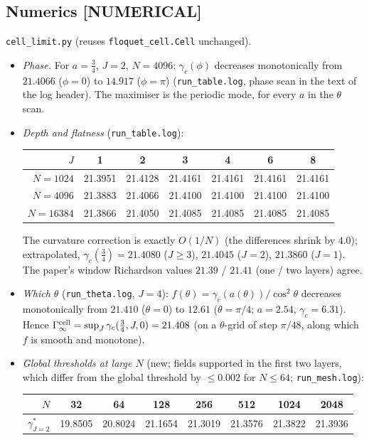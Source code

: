 \documentclass[11pt]{article}
\theoremstyle{definition}
\theoremstyle{remark}
\newcommand{\lab}[1]{\textbf{[#1]}}
\begin{document}
\subsection{Numerics \lab{NUMERICAL}}\label{sec:gamnum}
\texttt{cell\_limit.py} (reuses \texttt{floquet\_cell.Cell} unchanged).
\begin{itemize}
\item \emph{Phase.} For $a=\frac34$, $J=2$, $N=4096$: $\gamma_c(\phi)$ decreases monotonically from $21.4066$ ($\phi=0$) to $14.917$ ($\phi=\pi$) (\texttt{run\_table.log}, phase scan in the text of the log header). The maximiser is the periodic mode, for every $a$ in the $\theta$ scan.
\item \emph{Depth and flatness} (\texttt{run\_table.log}):
\begin{center}\small
\begin{tabular}{r|cccccc}
\toprule
$J$ & 1 & 2 & 3 & 4 & 6 & 8\\
\midrule
$N=1024$ & 21.3951 & 21.4128 & 21.4161 & 21.4161 & 21.4161 & 21.4161\\
$N=4096$ & 21.3883 & 21.4066 & 21.4100 & 21.4100 & 21.4100 & 21.4100\\
$N=16384$ & 21.3866 & 21.4050 & 21.4085 & 21.4085 & 21.4085 & 21.4085\\
\bottomrule
\end{tabular}
\end{center}
The curvature correction is exactly $O(1/N)$ (the differences shrink by $4.0$); extrapolated, $\gamma_c(\frac34)=21.4080$ ($J\ge3$), $21.4045$ ($J=2$), $21.3860$ ($J=1$). The paper's window Richardson values $21.39$ / $21.41$ (one / two layers) agree.
\item \emph{Which $\theta$} (\texttt{run\_theta.log}, $J=4$): $f(\theta)=\gamma_c(a(\theta))/\cos^2\theta$ decreases monotonically from $21.410$ ($\theta=0$) to $12.61$ ($\theta=\pi/4$; $a=2.54$, $\gamma_c=6.31$). Hence $\Gamma^{\rm cell}_\infty=\sup_J\gamma_c(\frac34,J,0)=21.408$ (on a $\theta$-grid of step $\pi/48$, along which $f$ is smooth and monotone).
\item \emph{Global thresholds at large $N$} (new; fields supported in the first two layers, which differ from the global threshold by $\le0.002$ for $N\le64$; \texttt{run\_mesh.log}):
\begin{center}\small
\begin{tabular}{r|ccccccc}
\toprule
$N$ & 32 & 64 & 128 & 256 & 512 & 1024 & 2048\\
\midrule
$\gamma^\ast_{J=2}$ & 19.8505 & 20.8024 & 21.1654 & 21.3019 & 21.3576 & 21.3822 & 21.3936\\

\end{tabular}
\end{center}
\end{itemize}
\end{document}
